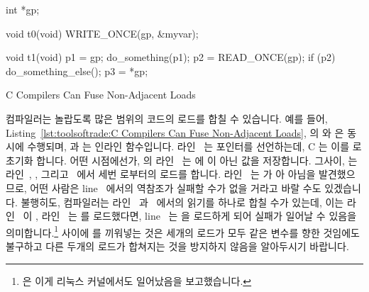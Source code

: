 \fi

\begin{listing}[tbp]
\begin{fcvlabel}
\begin{VerbatimL}[commandchars=\\\[\]]
int *gp; \lnlbl[gp]

void t0(void)
{
	WRITE_ONCE(gp, &myvar); \lnlbl[wgp]
}

void t1(void)
{
	p1 = gp; \lnlbl[p1]
	do_something(p1);
	p2 = READ_ONCE(gp); \lnlbl[p2]
	if (p2) { \lnlbl[if]
		do_something_else();
		p3 = *gp; \lnlbl[p3]
	}
}
\end{VerbatimL}
\end{fcvlabel}
\caption{C Compilers Can Fuse Non-Adjacent Loads}
\label{lst:toolsoftrade:C Compilers Can Fuse Non-Adjacent Loads}
\end{listing}

\begin{fcvref}
컴파일러는 놀랍도록 많은 범위의 코드의 로드를 합칠 수 있습니다.
예를 들어,
Listing~\ref{lst:toolsoftrade:C Compilers Can Fuse Non-Adjacent Loads},
의  와  은 동시에 수행되며,  과
 는 인라인 함수입니다.
라인~ 는  포인터를 선언하는데, C 는 이를  로 초기화
합니다.
어떤 시점에선가,  의 라인~ 는  에  이 아닌
값을 저장합니다.
그사이,  는 라인~, , 그리고~ 에서 세번
 로부터의 로드를 합니다.
라인~ 는  가  아 아님을 발견했으므로, 어떤 사람은
line~ 에서의 역참조가 실패할 수가 없을 거라고 바랄 수도 있겠습니다.
불행히도, 컴파일러는 라인~ 과~ 에서의 읽기를 하나로 합칠
수가 있는데, 이는 라인~ 이 , 라인~ 는 
를 로드했다면, line~ 는  을 로드하게 되어 실패가 일어날 수
있음을 의미합니다.\footnote{
	 은 이게 리눅스 커널에서도 일어났음을 보고했습니다.}
사이에  를 끼워넣는 것은 세개의 로드가 모두 같은 변수를 향한
것임에도 불구하고 다른 두개의 로드가 합쳐지는 것을 방지하지 않음을 알아두시기
바랍니다.
\end{fcvref}

\iffalse

